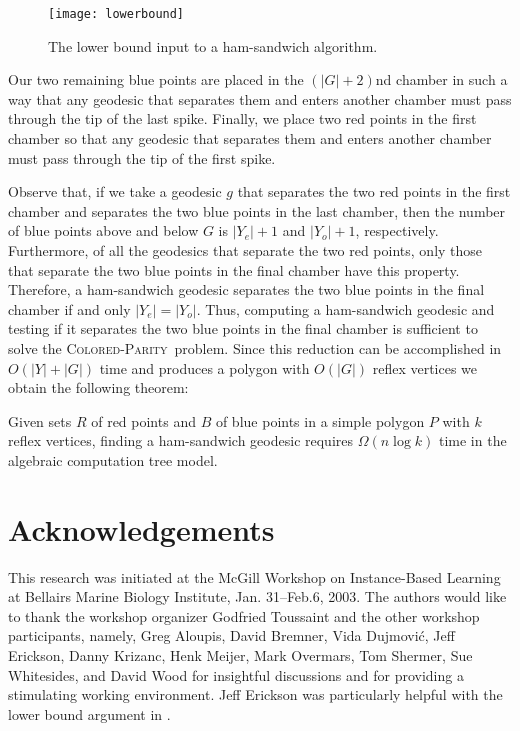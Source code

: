\documentclass[charterfonts,lotsofwhite]{patmorin}
\newcommand{\parity}{\textsc{Colored-Parity}}
\begin{document}
\begin{figure}[htbp]
\begin{center}\texttt{[image: lowerbound]}\end{center}
\caption{The lower bound input to a ham-sandwich algorithm.}
\end{figure}

Our two remaining blue points are placed in the $(|G|+2)$nd chamber in
such a way that any geodesic that separates them and enters another
chamber must pass through the tip of the last spike.  Finally, we
place two red points in the first chamber so that any geodesic that
separates them and enters another chamber must pass through the tip of
the first spike.

Observe that, if we take a geodesic $g$ that separates the two red
points in the first chamber and separates the two blue points in the
last chamber, then the number of blue points above and below $G$ is
$|Y_e|+1$ and $|Y_o|+1$, respectively.  Furthermore, of all the
geodesics that separate the two red points, only those that separate
the two blue points in the final chamber have this property.
Therefore, a ham-sandwich geodesic separates the two blue points in
the final chamber if and only $|Y_e|=|Y_o|$.  Thus, computing a
ham-sandwich geodesic and testing if it separates the two blue points
in the final chamber is sufficient to solve the \parity\ problem.
Since this reduction can be accomplished in $O(|Y|+|G|)$ time and
produces a polygon with $O(|G|)$ reflex vertices we obtain the
following theorem:

\begin{thm}
Given sets $R$ of red points and $B$ of blue points in a simple
polygon $P$ with $k$ reflex vertices, finding a ham-sandwich geodesic
requires $\Omega(n\log k)$ time in the algebraic computation tree
model.
\end{thm}


\section*{Acknowledgements}

This research was initiated at the McGill Workshop on 
Instance-Based Learning at Bellairs Marine Biology Institute, Jan.
31--Feb.6, 2003.  The authors would like to thank the workshop
organizer Godfried Toussaint and the other workshop
participants, namely, 
   Greg Aloupis,
   David Bremner,
   Vida Dujmovi\'c,
   Jeff Erickson,
   Danny Krizanc,
   Henk Meijer,
   Mark Overmars,
   Tom Shermer,
   Sue Whitesides, 
and
   David Wood for insightful
discussions and for providing a stimulating working environment.  Jeff
Erickson was particularly helpful with the lower bound argument in
.



\end{document}
